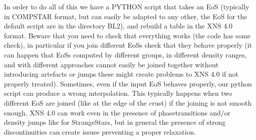 \documentclass[letterpaper,10pt,english]{sphinxmanual}
\begin{document}
\begin{itemize}
\end{itemize}

\sphinxAtStartPar
In order to do all of this we have a PYTHON script that takes an EoS (typically in COMPSTAR format, but can easily be adapted to any other, the EoS for the default script are in the directory BL2), and rebuild a table in the XNS 4.0 format. Beware that you need to check that everything works (the code has some check), in particular if you join different EoSs check that they behave properly (it can happen that EoSs computed by different groups, in different density ranges, and with different approaches cannot easily be joined together without introducing artefacts or jumps \sphinxhyphen{} these might create problems to XNS 4.0 if not properly treated). Sometimes, even if the input EoS behaves properly, our python script can produce a wrong interpolation. This typically happens when two different EoS are joined (like at the edge of the crust) if the joining is not smooth enough. XNS 4.0 can work even in the presence of phase\sphinxhyphen{}transitions and/or density jumps like for Strange\sphinxhyphen{}Stars, but in general the presence of strong discontinuities can create issues preventing a proper relaxation.
\end{document}
